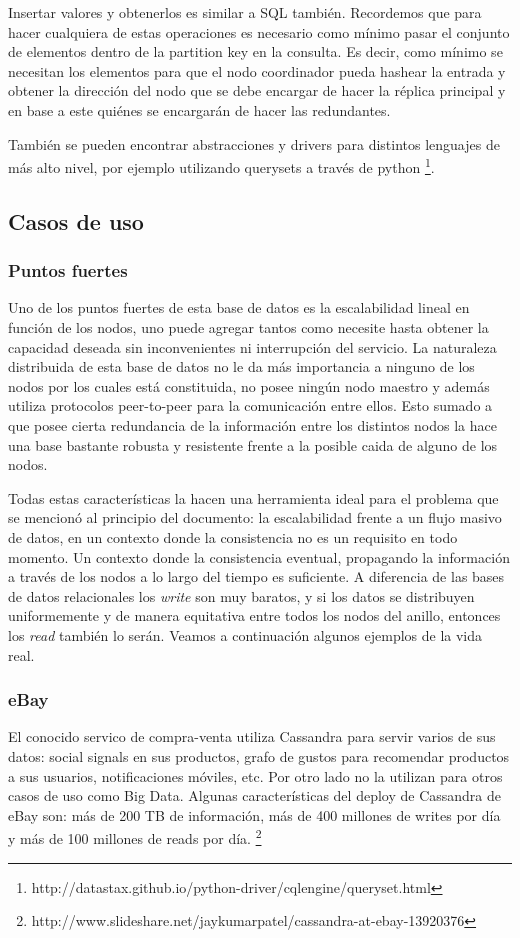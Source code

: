 \documentclass[11pt,a4paper]{article}
\begin{document}
Insertar valores y obtenerlos es similar a SQL también. Recordemos que para hacer cualquiera de estas operaciones es necesario como mínimo pasar el conjunto de elementos dentro de la partition key en la consulta. Es decir, como mínimo se necesitan los elementos para que el nodo coordinador pueda hashear la entrada y obtener la dirección del nodo que se debe encargar de hacer la réplica principal y en base a este quiénes se encargarán de hacer las redundantes.

También se pueden encontrar abstracciones y drivers para distintos lenguajes de más alto nivel, por ejemplo utilizando querysets a través de python \footnote{http://datastax.github.io/python-driver/cqlengine/queryset.html}.

\subsection{Casos de uso}

\subsubsection{Puntos fuertes}
Uno de los puntos fuertes de esta base de datos es la escalabilidad lineal en función de los nodos, uno puede agregar tantos como necesite hasta obtener la capacidad deseada sin inconvenientes ni interrupción del servicio. La naturaleza distribuida de esta base de datos no le da más importancia a ninguno de los nodos por los cuales está constituida, no posee ningún nodo maestro y además utiliza protocolos peer-to-peer para la comunicación entre ellos. Esto sumado a que posee cierta redundancia de la información entre los distintos nodos la hace una base bastante robusta y resistente frente a la posible caida de alguno de los nodos.

Todas estas características la hacen una herramienta ideal para el problema que se mencionó al principio del documento: la escalabilidad frente a un flujo masivo de datos, en un contexto donde la consistencia no es un requisito en todo momento. Un contexto donde la consistencia eventual, propagando la información a través de los nodos a lo largo del tiempo es suficiente. A diferencia de las bases de datos relacionales los \textit{write} son muy baratos, y si los datos se distribuyen uniformemente y de manera equitativa entre todos los nodos del anillo, entonces los \textit{read} también lo serán. Veamos a continuación algunos ejemplos de la vida real.

\subsubsection{eBay}
El conocido servico de compra-venta utiliza Cassandra para servir varios de sus datos: social signals en sus productos, grafo de gustos para recomendar productos a sus usuarios, notificaciones móviles, etc. Por otro lado no la utilizan para otros casos de uso como Big Data. Algunas características del deploy de Cassandra de eBay son: más de 200 TB de información, más de 400 millones de writes por día y más de 100 millones de reads por día. \footnote{http://www.slideshare.net/jaykumarpatel/cassandra-at-ebay-13920376}
\end{document}

